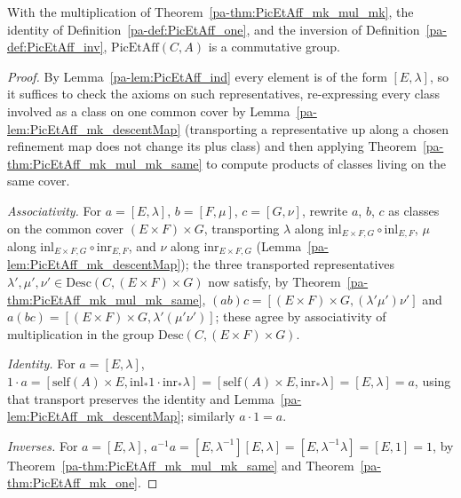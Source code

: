 \begin{theorem}
  \label{pa-thm:PicEtAff_commGroup}
  \leanok

  With the multiplication of Theorem~\ref{pa-thm:PicEtAff_mk_mul_mk}, the identity of
  Definition~\ref{pa-def:PicEtAff_one}, and the inversion of Definition~\ref{pa-def:PicEtAff_inv},
  \(\mathrm{PicEtAff}(C,A)\) is a commutative group.
\end{theorem}
\begin{proof}
  \leanok
  By Lemma~\ref{pa-lem:PicEtAff_ind} every element is of the form \([E,\lambda]\), so it suffices
  to check the axioms on such representatives, re-expressing every class involved as a class on
  one common cover by Lemma~\ref{pa-lem:PicEtAff_mk_descentMap} (transporting a representative up
  along a chosen refinement map does not change its plus class) and then applying
  Theorem~\ref{pa-thm:PicEtAff_mk_mul_mk_same} to compute products of classes living on the same
  cover.

  \emph{Associativity.} For \(a = [E,\lambda]\), \(b = [F,\mu]\), \(c = [G,\nu]\), rewrite
  \(a\), \(b\), \(c\) as classes on the common cover \((E \times F) \times G\), transporting
  \(\lambda\) along \(\mathrm{inl}_{E \times F, G} \circ \mathrm{inl}_{E,F}\), \(\mu\) along
  \(\mathrm{inl}_{E \times F, G} \circ \mathrm{inr}_{E,F}\), and \(\nu\) along
  \(\mathrm{inr}_{E \times F, G}\) (Lemma~\ref{pa-lem:PicEtAff_mk_descentMap}); the three
  transported representatives \(\lambda', \mu', \nu' \in \mathrm{Desc}(C, (E \times F) \times
  G)\) now satisfy, by Theorem~\ref{pa-thm:PicEtAff_mk_mul_mk_same}, \((ab)c = [(E \times F)
  \times G, (\lambda'\mu')\nu']\) and \(a(bc) = [(E \times F) \times G, \lambda'(\mu'\nu')]\);
  these agree by associativity of multiplication in the group \(\mathrm{Desc}(C,(E \times F)
  \times G)\).

  \emph{Identity.} For \(a = [E,\lambda]\), \(1 \cdot a = [\mathrm{self}(A) \times E,
  \mathrm{inl}_{*}1 \cdot \mathrm{inr}_{*}\lambda] = [\mathrm{self}(A) \times E,
  \mathrm{inr}_{*}\lambda] = [E,\lambda] = a\), using that transport preserves the identity and
  Lemma~\ref{pa-lem:PicEtAff_mk_descentMap}; similarly \(a \cdot 1 = a\).

  \emph{Inverses.} For \(a = [E,\lambda]\), \(a^{-1} a = [E,\lambda^{-1}][E,\lambda] =
  [E,\lambda^{-1}\lambda] = [E,1] = 1\), by Theorem~\ref{pa-thm:PicEtAff_mk_mul_mk_same} and
  Theorem~\ref{pa-thm:PicEtAff_mk_one}.


\end{proof}
